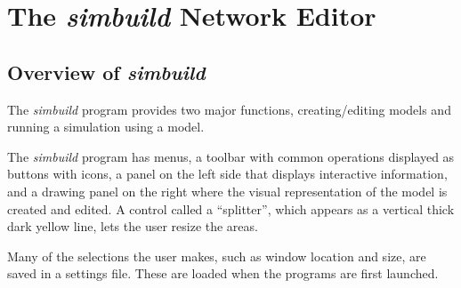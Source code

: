 \documentclass[12pt,openany,oneside]{book}
\newcommand{\prog}[1]{\textit{{#1}}}
\newcommand{\inquotes}[1]{{{``#1''}}}
\begin{document}
\section{The \prog{simbuild} Network Editor}

\subsection{Overview of \prog{simbuild}}

The \prog{simbuild} program provides two major functions, 
creating/editing models and running a simulation using a model.

The \prog{simbuild} program has menus, a toolbar with common operations 
displayed as buttons with icons, a panel on the left side that 
displays interactive information, and a drawing panel on the right
where the visual representation of the model is created and edited.
A control called a \inquotes{splitter}, which appears as a vertical thick 
dark yellow line, lets the user resize the areas.

Many of the selections the user makes, such as window location and size,
are saved in a settings file. These are loaded when the programs
are first launched.
\end{document}
